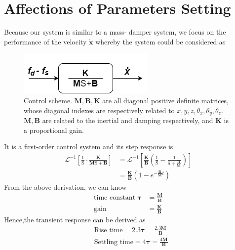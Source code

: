 \section{Affections of Parameters Setting}
\label{sec:affection}
Because our system is similar to a mass- damper system, we focus on the performance of the velocity $\boldsymbol{\dot{x}}$ whereby the system could be considered as
\begin{figure}[htbp]
\begin{center}
\includegraphics[width=0.6\linewidth]{Images/mass spring.png}
\hspace*{6mm}\end{center}
\caption{
Control scheme. $\mathbf{M},\mathbf{B},\mathbf{K}$ are all diagonal positive definite matrices, whose diagonal indexes are respectively related to $x,y,z,\theta_x,\theta_y,\theta_z$. $\mathbf{M},\mathbf{B}$ are related to the inertial and damping respectively, and $\mathbf{K}$ is a proportional gain. 
}\label{fig:mass spring}
\end{figure}
\par\noindent
It is a first-order control system and its step response is 
\begin{equation}
\begin{split}
\mathcal{L}^{-1} \left[ \frac{1}{\mathrm{S}} \cdot \frac{\mathbf{K}}{\mathbf{M}\mathrm{S}+\mathbf{B}} \right] 
&= \mathcal{L}^{-1} \left[ \frac{\mathbf{K}}{\mathbf{B}} \left( \frac{1}{\mathrm{S}} - \frac{1}{\mathrm{S}+\frac{\mathbf{B}}{\mathbf{M}}} \right) \right] \\
&= \frac{\mathbf{K}}{\mathbf{B}} \left(1 - e^{- \frac{\mathbf{B}}{\mathbf{M}} t}  \right)
\end{split}
\end{equation}
From the above derivation, we can know 
\begin{equation}
\begin{split}
\text{time constant } \boldsymbol{\tau} &= \frac{\mathbf{M}}{\mathbf{B}}\\
\text{gain} &= \frac{\mathbf{K}}{\mathbf{B}}
\end{split}
\end{equation}
Hence,the transient response can be derived as 
\begin{equation}
\begin{split}
&\text{Rise time} = 2.3\boldsymbol{\tau} = \frac{2.3 \mathbf{M}}{\mathbf{B}}\\
&\text{Settling time} = 4\boldsymbol{\tau} =  \frac{4 \mathbf{M}}{\mathbf{B}}\\
\end{split}
\end{equation}
